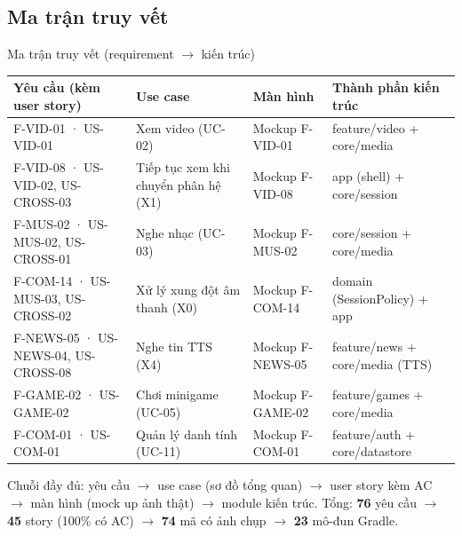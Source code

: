 \subsection{Ma trận truy vết}
\begin{frame}{Ma trận truy vết (requirement $\rightarrow$ kiến trúc)}
\begin{center}\tiny
\setlength{\tabcolsep}{3pt}
\begin{tabular}{@{}p{4.0cm}p{3.0cm}p{2.5cm}p{3.8cm}@{}}
\toprule
\textbf{Yêu cầu (kèm user story)} & \textbf{Use case} & \textbf{Màn hình} & \textbf{Thành phần kiến trúc} \\
\midrule
F-VID-01 · US-VID-01 & Xem video (UC-02) & Mockup F-VID-01 & feature/video + core/media \\
F-VID-08 · US-VID-02, US-CROSS-03 & Tiếp tục xem khi chuyển phân hệ (X1) & Mockup F-VID-08 & app (shell) + core/session \\
F-MUS-02 · US-MUS-02, US-CROSS-01 & Nghe nhạc (UC-03) & Mockup F-MUS-02 & core/session + core/media \\
F-COM-14 · US-MUS-03, US-CROSS-02 & Xử lý xung đột âm thanh (X0) & Mockup F-COM-14 & domain (SessionPolicy) + app \\
F-NEWS-05 · US-NEWS-04, US-CROSS-08 & Nghe tin TTS (X4) & Mockup F-NEWS-05 & feature/news + core/media (TTS) \\
F-GAME-02 · US-GAME-02 & Chơi minigame (UC-05) & Mockup F-GAME-02 & feature/games + core/media \\
F-COM-01 · US-COM-01 & Quản lý danh tính (UC-11) & Mockup F-COM-01 & feature/auth + core/datastore \\
\bottomrule
\end{tabular}
\end{center}
\vspace{1.5mm}
{\tiny\color{TextGray} Chuỗi đầy đủ: yêu cầu $\rightarrow$ use case (sơ đồ tổng quan) $\rightarrow$ user story kèm AC $\rightarrow$ màn hình (mock up ảnh thật) $\rightarrow$ module kiến trúc. Tổng: \textbf{76} yêu cầu $\rightarrow$ \textbf{45} story (100\% có AC) $\rightarrow$ \textbf{74} mã có ảnh chụp $\rightarrow$ \textbf{23} mô-đun Gradle.}
\end{frame}
